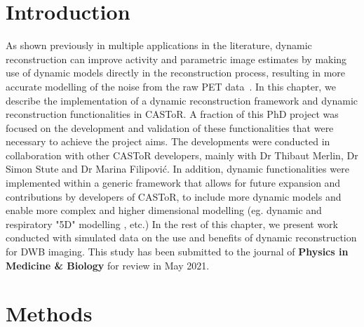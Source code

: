 \section{Introduction}

As shown previously in multiple applications in the literature, dynamic reconstruction can improve activity and parametric image estimates by making use of dynamic models directly in the reconstruction process, resulting in more accurate modelling of the noise from the raw PET data~\cite{Reader2014}. 
In this chapter, we describe the implementation of a dynamic reconstruction framework and dynamic reconstruction functionalities in CASToR. A fraction of this PhD project was focused on the development and validation of these functionalities that were necessary to achieve the project aims. The developments were conducted in collaboration with other CASToR developers, mainly with Dr Thibaut Merlin, Dr Simon Stute and Dr Marina Filipović.
In addition, dynamic functionalities were implemented within a generic framework that allows for future expansion and contributions by developers of CASToR, to include more dynamic models and enable more complex and higher dimensional modelling (eg. dynamic and respiratory "5D" modelling , etc.)
In the rest of this chapter, we present work conducted with simulated data on the use and benefits of dynamic reconstruction for DWB imaging. This study has been submitted to the journal of \textbf{Physics in Medicine \& Biology} for review in May 2021. 

\section{Methods}

